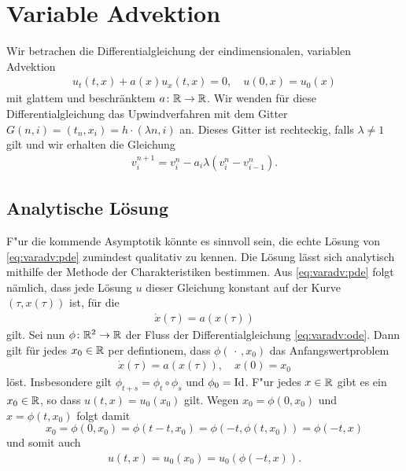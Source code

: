 \section{Variable Advektion}
\label{sec:varadv}

Wir betrachen die Differentialgleichung der eindimensionalen, variablen Advektion
\begin{align}\label{eq:varadv:pde}
u_t(t,x) + a(x) u_x(t,x) = 0, \quad u(0,x) = u_0(x)
\end{align}
mit glattem und beschränktem $a\colon \mathbb R \to \mathbb R$.
Wir wenden für diese Differentialgleichung das Upwindverfahren mit dem Gitter $G(n,i) = (t_n, x_i) = h \cdot (\lambda n,i)$ an.
Dieses Gitter ist rechteckig, falls $\lambda \neq 1$ gilt und wir erhalten die Gleichung
\begin{align}\label{eq:varadv:verfahren}
v^{n+1}_i = v^n_i - a_i \lambda \left( v^n_i - v^n_{i-1} \right).
\end{align}

\subsection{Analytische Lösung}

F"ur die kommende Asymptotik könnte es sinnvoll sein, die echte Lösung von \eqref{eq:varadv:pde} zumindest qualitativ zu kennen.
Die Lösung lässt sich analytisch mithilfe der Methode der Charakteristiken bestimmen.
Aus \eqref{eq:varadv:pde} folgt nämlich, dass jede Lösung $u$ dieser Gleichung konstant auf der Kurve $(\tau, x(\tau))$ ist, für die
\begin{align} \label{eq:varadv:ode}
\dot x(\tau) = a(x(\tau))
\end{align} gilt.
Sei nun $\phi\colon \mathbb R^2 \to \mathbb R$ der Fluss der Differentialgleichung \eqref{eq:varadv:ode}.
Dann gilt für jedes $x_0 \in \mathbb R$ per defintionem, dass $\phi(\, \cdot \,,x_0)$ das Anfangswertproblem \begin{align}\label{eq:varadv:ivp} \dot x(\tau) = a(x(\tau)), \quad x(0) = x_0 \end{align} löst.
Insbesondere gilt $\phi_{t+s} = \phi_t \circ \phi_s$ und $\phi_0 = \operatorname{Id}$.
F"ur jedes $x \in \mathbb R$ gibt es ein $x_0 \in \mathbb R$, so dass $u(t,x) = u_0(x_0)$ gilt.
Wegen $x_0 = \phi(0,x_0)$ und $x = \phi(t, x_0)$ folgt damit \[ x_0 = \phi(0, x_0) = \phi(t - t, x_0) = \phi(-t, \phi(t, x_0)) = \phi(-t, x) \] und somit auch \begin{align}\label{eq:varadv:analytic_solution} u(t,x) = u_0(x_0) = u_0(\phi(-t, x)).\end{align}

